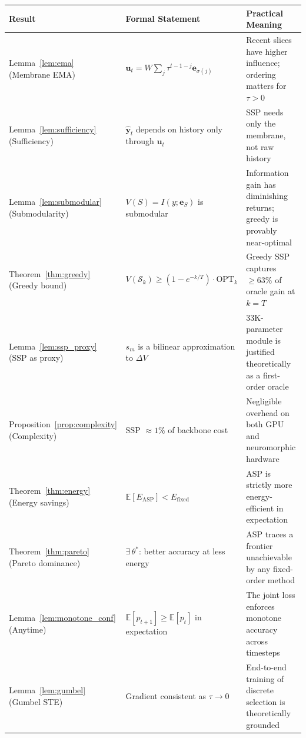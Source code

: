 \documentclass[11pt,a4paper]{article}
\newcommand{\bu}{\mathbf{u}}
\newcommand{\be}{\mathbf{e}}
\newcommand{\by}{\mathbf{y}}
\newcommand{\cS}{\mathcal{S}}
\newcommand{\EE}{\mathbb{E}}
\begin{document}
\begin{center}
\begin{tabular}{p{3.5cm}p{4.5cm}p{4.5cm}}
\toprule
\textbf{Result} & \textbf{Formal Statement} & \textbf{Practical Meaning} \\
\midrule
Lemma~\ref{lem:ema} (Membrane EMA)
  & $\bu_t = W \sum_j \tau^{t-1-j} \be_{\sigma(j)}$
  & Recent slices have higher influence; ordering matters for $\tau > 0$ \\
\addlinespace
Lemma~\ref{lem:sufficiency} (Sufficiency)
  & $\hat{\by}_t$ depends on history only through $\bu_t$
  & SSP needs only the membrane, not raw history \\
\addlinespace
Lemma~\ref{lem:submodular} (Submodularity)
  & $V(S)=I(y;\be_S)$ is submodular
  & Information gain has diminishing returns; greedy is provably near-optimal \\
\addlinespace
Theorem~\ref{thm:greedy} (Greedy bound)
  & $V(\cS_k) \geq (1-e^{-k/T}) \cdot \mathrm{OPT}_k$
  & Greedy SSP captures $\geq 63\%$ of oracle gain at $k=T$ \\
\addlinespace
Lemma~\ref{lem:ssp_proxy} (SSP as proxy)
  & $s_m$ is a bilinear approximation to $\Delta V$
  & 33K-parameter module is justified theoretically as a first-order oracle \\
\addlinespace
Proposition~\ref{prop:complexity} (Complexity)
  & SSP $\approx 1\%$ of backbone cost
  & Negligible overhead on both GPU and neuromorphic hardware \\
\addlinespace
Theorem~\ref{thm:energy} (Energy savings)
  & $\EE[E_\mathrm{ASP}] < E_\mathrm{fixed}$
  & ASP is strictly more energy-efficient in expectation \\
\addlinespace
Theorem~\ref{thm:pareto} (Pareto dominance)
  & $\exists\, \theta^*$: better accuracy at less energy
  & ASP traces a frontier unachievable by any fixed-order method \\
\addlinespace
Lemma~\ref{lem:monotone_conf} (Anytime)
  & $\EE[p_{t+1}] \geq \EE[p_t]$ in expectation
  & The joint loss enforces monotone accuracy across timesteps \\
\addlinespace
Lemma~\ref{lem:gumbel} (Gumbel STE)
  & Gradient consistent as $\tau \to 0$
  & End-to-end training of discrete selection is theoretically grounded \\
\bottomrule
\end{tabular}
\end{center}
\end{document}
